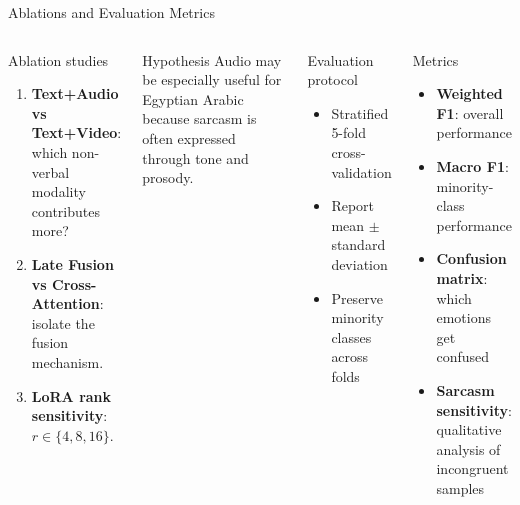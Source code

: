 \documentclass[aspectratio=169,10pt]{beamer}
\newcommand{\term}[1]{\textbf{\textcolor{MidBlue}{#1}}}
\begin{document}
\begin{frame}[t]{Ablations and Evaluation Metrics}
\begin{columns}[T,onlytextwidth]
\begin{block}{Ablation studies}
\begin{enumerate}
  \item \textbf{Text+Audio vs Text+Video}: which non-verbal modality contributes more?
  \item \textbf{Late Fusion vs Cross-Attention}: isolate the fusion mechanism.
  \item \textbf{LoRA rank sensitivity}: $r \in \{4,8,16\}$.
\end{enumerate}
\end{block}
\begin{exampleblock}{Hypothesis}
Audio may be especially useful for Egyptian Arabic because sarcasm is often expressed through tone and prosody.
\end{exampleblock}
\begin{block}{Evaluation protocol}
\begin{itemize}
  \item Stratified 5-fold cross-validation
  \item Report mean $\pm$ standard deviation
  \item Preserve minority classes across folds
\end{itemize}
\end{block}
\begin{block}{Metrics}
\begin{itemize}
  \item \term{Weighted F1}: overall performance
  \item \term{Macro F1}: minority-class performance
  \item \term{Confusion matrix}: which emotions get confused
  \item \term{Sarcasm sensitivity}: qualitative analysis of incongruent samples
\end{itemize}
\end{block}
\end{columns}
\end{frame}
\end{document}
